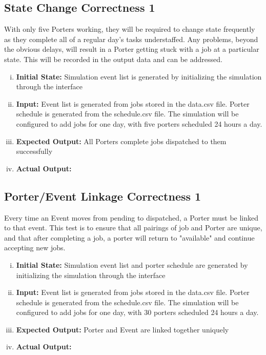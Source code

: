 \documentclass[paper=letter, fontsize=10pt]{scrartcl}
\numberwithin{equation}{section}		%
\numberwithin{figure}{section}			%
\numberwithin{table}{section}				%
\begin{document}
\subsection{State Change Correctness 1}
With only five Porters working, they will be required to change state frequently as they complete all of a regular day's tasks understaffed. Any problems, beyond the obvious delays, will result in a Porter getting stuck with a job at a particular state. This will be recorded in the output data and can be addressed.
\begin{enumerate}[(i)]
	\item \textbf{Initial State:} Simulation event list is generated by initializing the simulation through the interface
	\item \textbf{Input:} Event list is generated from jobs stored in the data.csv file. Porter schedule is generated from the schedule.csv file. The simulation will be configured to add jobs for one day, with five porters scheduled 24 hours a day.
	\item \textbf{Expected Output:} All Porters complete jobs dispatched to them successfully
	\item \textbf{Actual Output:}
\end{enumerate}

\subsection{Porter/Event Linkage Correctness 1}
Every time an Event moves from pending to dispatched, a Porter must be linked to that event. This test is to ensure that all pairings of job and Porter are unique, and that after completing a job, a porter will return to "available" and continue accepting new jobs.
\begin{enumerate}[(i)]
	\item \textbf{Initial State:} Simulation event list and porter schedule are generated by initializing the simulation through the interface
	\item \textbf{Input:} Event list is generated from jobs stored in the data.csv file. Porter schedule is generated from the schedule.csv file. The simulation will be configured to add jobs for one day, with 30 porters scheduled 24 hours a day.
	\item \textbf{Expected Output:} Porter and Event are linked together uniquely
	\item \textbf{Actual Output:}
\end{enumerate}
\end{document}
